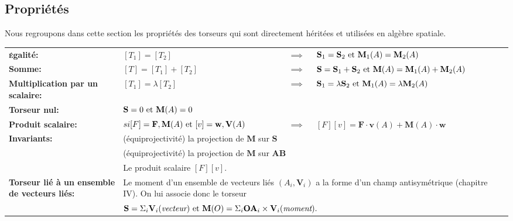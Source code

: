 \subsection{Propriétés} \label{appx_torseursToalgSpa_torseurs_prop}

Nous regroupons dans cette section les propriétés des torseurs qui sont directement héritées et utilisées en algèbre spatiale.

\begin{flushleft}
\begin{spacing}{1.5}
\begin{tabular}{ l l c p{5cm} }
  \textbf{\textsc{é}galité:}
  & $[T_{1}]=[T_{2}]$ & $\implies$ & $\mathbf{S}_{1}=\mathbf{S}_{2} \textnormal{ et } \mathbf{M}_{1}(A)=\mathbf{M}_{2}(A)$ \\
  \textbf{Somme:}
  & $[T]=[T_{1}]+[T_{2}]$ & $\implies$ & $\mathbf{S}=\mathbf{S}_{1}+\mathbf{S}_{2} \textnormal{ et } \mathbf{M}(A)=\mathbf{M}_{1}(A)+\mathbf{M}_{2}(A)$ \\
  \textbf{Multiplication par un scalaire:}
  & $[T_{1}]=\lambda [T_{2}]$ & $\implies$ & $\mathbf{S}_{1}=\lambda \mathbf{S}_{2} \textnormal{ et } \mathbf{M}_{1}(A)=\lambda \mathbf{M}_{2}(A)$ \\
  \textbf{Torseur nul:}
  & \multicolumn{3}{l}{$\mathbf{S}=0 \textnormal{ et } \mathbf{M}(A)=0$} \\
  \textbf{Produit scalaire:}
  & $si [F]={\mathbf{F},\mathbf{M}(A)} \textnormal{ et } [v]={\mathbf{w},\mathbf{V}(A)}$ & $\implies$ & $[F][v] = \mathbf{F} \cdot \mathbf{v}(A) + \mathbf{M}(A) \cdot \mathbf{w}$ \\
  \textbf{Invariants:}
  & \multicolumn{3}{l}{(équiprojectivité) la projection de $\mathbf{M}$ sur $\mathbf{S}$} \\
  & \multicolumn{3}{l}{(équiprojectivité) la projection de $\mathbf{M}$ sur $\mathbf{AB}$} \\
  & \multicolumn{3}{l}{Le produit scalaire $[F][v]$.} \\
  \multicolumn{1}{p{6cm}}{\textbf{Torseur lié à un ensemble de vecteurs liés:}}
  & \multicolumn{3}{p{10cm}}{Le moment d'un ensemble de vecteurs liés ${(A_{i},\mathbf{V}_{i})}$ a la forme d'un champ antisymétrique \cite{bib_champVecteurs} (chapitre IV). On lui associe donc
  le torseur} \\
  & \multicolumn{3}{l}{$\mathbf{S}=\Sigma_{i}\mathbf{V}_{i} (\emph{vecteur}) \textnormal{ et } \mathbf{M}(O)=\Sigma_{i}\mathbf{OA}_{i} \times \mathbf{V}_{i} (\emph{moment}).$} \\
\end{tabular}
\end{spacing}
\end{flushleft}

